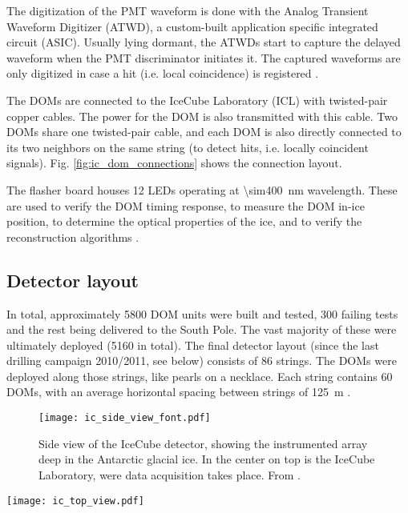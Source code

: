 The digitization of the PMT waveform is done with the Analog Transient Waveform Digitizer (ATWD), a custom-built application specific integrated circuit (ASIC). Usually lying dormant, the ATWDs start to capture the delayed waveform when the PMT discriminator initiates it. The captured waveforms are only digitized in case a hit (i.e. local coincidence) is registered .

The DOMs are connected to the IceCube Laboratory (ICL) with twisted-pair copper cables. The power for the DOM is also transmitted with this cable. Two DOMs share one twisted-pair cable, and each DOM is also directly connected to its two neighbors on the same string (to detect hits, i.e. locally coincident signals). Fig. \ref{fig:ic_dom_connections} shows the connection layout.

The flasher board houses 12 LEDs operating at \SI{\sim400}{\nm} wavelength. These are used to verify the DOM timing response, to measure the DOM in-ice position, to determine the optical properties of the ice, and to verify the reconstruction algorithms \cite{Aartsen2017}.

\subsection{Detector layout}
In total, approximately 5800 DOM units were built and tested, 300 failing tests and the rest being delivered to the South Pole. The vast majority of these were ultimately deployed (5160 in total). The final detector layout (since the last drilling campaign 2010/2011, see below) consists of 86 strings. The DOMs were deployed along those strings, like pearls on a necklace. Each string contains 60 DOMs, with an average horizontal spacing between strings of \SI{125}{\meter} \cite{Aartsen2017}.

\begin{figure}
    \texttt{[image: ic\_side\_view\_font.pdf]}
    \caption[IceCube side-on]{Side view of the IceCube detector, showing the instrumented array deep in the Antarctic glacial ice. In the center on top is the IceCube Laboratory, were data acquisition takes place. From \cite{Ahlers2018a}.}
\end{figure}
\begin{marginfigure}
    \texttt{[image: ic\_top\_view.pdf]}
    \caption[IceCube top-down view]{Top-down view of the IceCube detector, spanning \SI{1}{\square\km} on the surface. From \cite{Ahlers2018a}.}
\end{marginfigure}

